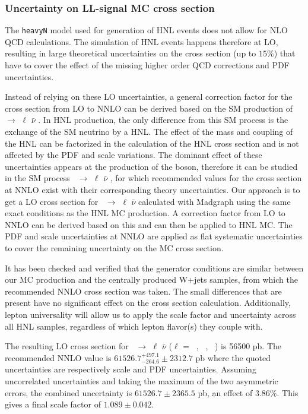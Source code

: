 \subsubsection{Uncertainty on LL-signal MC cross section}\label{sec:c4lo}
The \texttt{heavyN} model used for generation of HNL events does not allow for NLO QCD calculations. The simulation of HNL events happens therefore at LO, resulting in large theoretical uncertainties on the cross section (up to $15\%$) that have to cover the effect of the missing higher order QCD corrections and PDF uncertainties.

Instead of relying on these LO uncertainties, a general correction factor for the cross section from LO to NNLO can be derived based on the SM production of \PW\ $\rightarrow$ $\ell$ $\bar{\nu}$ . In HNL production, the only difference from this SM process is the exchange of the SM neutrino by a HNL. The effect of the mass and coupling of the HNL can be factorized in the calculation of the HNL cross section and is not affected by the PDF and scale variations. The dominant effect of these uncertainties appears at the production of the \PW boson, therefore it can be studied in the SM process \PW\ $\rightarrow$ $\ell$ $\bar{\nu}$ , for which recommended values for the cross section at NNLO exist with their corresponding theory uncertainties. Our approach is to get a LO cross section for \PW\ $\rightarrow$ $\ell$ $\bar{\nu}$ calculated with Madgraph using the same exact conditions as the HNL MC production. A correction factor from LO to NNLO can be derived based on this and can then be applied to HNL MC. The PDF and scale uncertainties at NNLO are applied as flat systematic uncertainties to cover the remaining uncertainty on the MC cross section.

It has been checked and verified that the generator conditions are similar between our MC production and the centrally produced W+jets samples, from which the recommended NNLO cross section was taken. The small differences that are present have no significant effect on the cross section calculation. Additionally, lepton universality will allow us to apply the scale factor and uncertainty across all HNL samples, regardless of which lepton flavor(s) they couple with.

The resulting LO cross section for \PW\ $\rightarrow$ $\ell$
$\bar{\nu}$ ($\ell$ = \Pe\ , \PGm\ , \PGt\ ) is 56500 pb. The recommended NNLO value is $61526.7^{+497.1}_{-264.6}\pm 2312.7$ pb where the quoted uncertainties are respectively scale and PDF uncertainties. Assuming uncorrelated uncertainties and taking the maximum of the two asymmetric errors, the combined uncertainty is $61526.7 \pm 2365.5$ pb, an effect of $3.86\%$. This gives a final scale factor of $1.089 \pm 0.042$.

